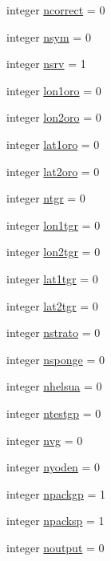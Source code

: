 \begin{DoxyCompactItemize}
\item 
integer \hyperlink{classpumamod_a1454296ae1e1d03a284178628a4a3e84}{ncorrect} = 0
\item 
integer \hyperlink{classpumamod_a688f0876bf83c724d71700aa98835d6e}{nsym} = 0
\item 
integer \hyperlink{classpumamod_aca88948c25a082cc21503423423a9cad}{nsrv} = 1
\item 
integer \hyperlink{classpumamod_a1f0d5ea8b0f0de798929e63bb5904e86}{lon1oro} = 0
\item 
integer \hyperlink{classpumamod_a5acbb0c115c64b84b8b1b25ad84f30aa}{lon2oro} = 0
\item 
integer \hyperlink{classpumamod_aa7bc46dd3fcacd50e1946b36f1df9f6e}{lat1oro} = 0
\item 
integer \hyperlink{classpumamod_ab0d522022938c1aea11f6c7e31ad8e65}{lat2oro} = 0
\item 
integer \hyperlink{classpumamod_a57aac3712e7ae661fa9dd04fe6495ff0}{ntgr} = 0
\item 
integer \hyperlink{classpumamod_a5413d20acb64106fee3e0b8cd6b99efd}{lon1tgr} = 0
\item 
integer \hyperlink{classpumamod_a76c8a5bcafbc5b01c5d6c9732a5cdcf1}{lon2tgr} = 0
\item 
integer \hyperlink{classpumamod_a92dedf7e953e229c20b8bb58cb042415}{lat1tgr} = 0
\item 
integer \hyperlink{classpumamod_a3f3522edc6079ba74938bdcf2a780610}{lat2tgr} = 0
\item 
integer \hyperlink{classpumamod_a4e187fd01cc77d813b423d7fb921252d}{nstrato} = 0
\item 
integer \hyperlink{classpumamod_adb0a88ab45e621b010dc35fb9648b4e4}{nsponge} = 0
\item 
integer \hyperlink{classpumamod_a0f47e459576ce1b123298a6c3dd7d91b}{nhelsua} = 0
\item 
integer \hyperlink{classpumamod_a57b5b04397af1927fb03ce17e7376949}{ntestgp} = 0
\item 
integer \hyperlink{classpumamod_a24838036db3be03c1a4b61262d662f89}{nvg} = 0
\item 
integer \hyperlink{classpumamod_ab503ecf77d192f1191181556fa21346e}{nyoden} = 0
\item 
integer \hyperlink{classpumamod_a9cd1e899ff739d1fde6cb241167a0b14}{npackgp} = 1
\item 
integer \hyperlink{classpumamod_a3df9e3f62930046dd998328d83f90782}{npacksp} = 1
\item 
integer \hyperlink{classpumamod_ab83d8b5f0baf291cbf7be672044ddbaf}{noutput} = 0

\end{DoxyCompactItemize}
